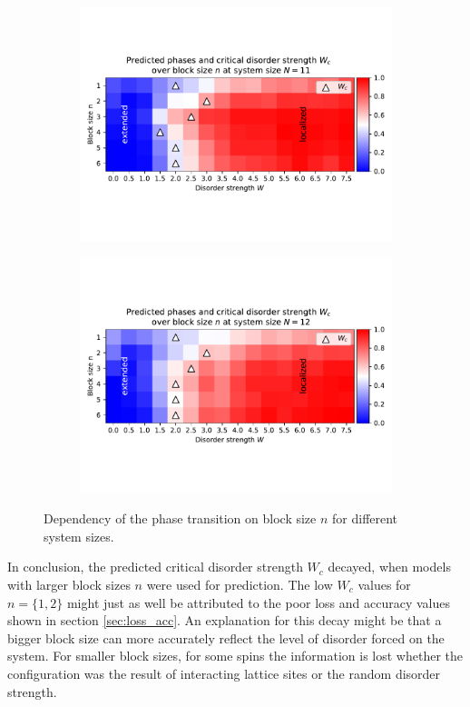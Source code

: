 \documentclass[reprint,amsmath,amssymb,aps,prb]{revtex4-2}
\begin{document}
\begin{center}
\begin{figure}[H]
\begin{subfigure}[c]{0.45\textwidth}
			\includegraphics[width=\textwidth]{../results/Wc/N11_Wc_n_dependency.pdf}
		\end{subfigure}
		\begin{subfigure}[c]{0.45\textwidth}
			\includegraphics[width=\textwidth]{../results/Wc/N12_Wc_n_dependency.pdf}
		\end{subfigure}
		\caption{Dependency of the phase transition on block size $n$ for different system sizes.}
		\label{fig:wcextract}
	\end{figure}
\end{center}
\twocolumngrid
In conclusion, the predicted critical disorder strength $W_c$ decayed, when models with larger block sizes $n$ were used for prediction. The low $W_c$ values for $n=\{1,2\}$ might just as well be attributed to the poor loss and accuracy values shown in section \ref{sec:loss_acc}. An explanation for this decay might be that a bigger block size can more accurately reflect the level of disorder forced on the system. For smaller block sizes, for some spins the information is lost whether the configuration was the result of interacting lattice sites or the random disorder strength.
\end{document}

